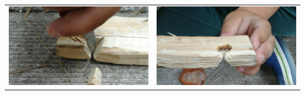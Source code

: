 \documentclass[a4paper, handout]{beamer}
\begin{document}
\begin{frame}
\begin{tabular}{ c c }
		\\
		\includegraphics[scale=0.15]{inkeping-5}
		&
		\includegraphics[scale=0.15]{inkeping-6}
		\\
	\end{tabular}
\end{frame}
\end{document}
